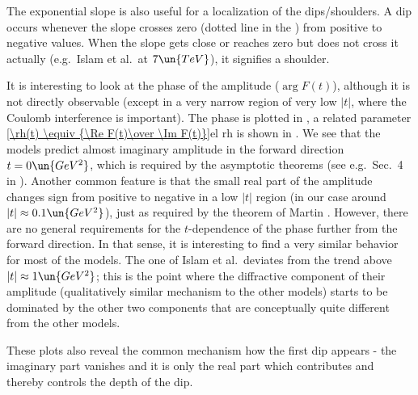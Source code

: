 The exponential slope is also useful for a localization of the dips/shoulders. A dip occurs whenever the slope crosses zero (dotted line in the ) from positive to negative values. When the slope gets close or reaches zero but does not cross it actually (e.g.~Islam et al.\ at $7\un{TeV}$), it signifies a shoulder.


It is interesting to look at the phase of the amplitude ($\arg F(t)$), although it is not directly observable (except in a very narrow region of very low $|t|$, where the Coulomb interference is important). The phase is plotted in , a related parameter 
\eqref{\rh(t) \equiv {\Re F(t)\over \Im F(t)}}{el rh}
is shown in . We see that the models predict almost imaginary amplitude in the forward direction $t=0\un{GeV^2}$, which is required by the asymptotic theorems (see e.g.~Sec.~4 in ). Another common feature is that the small real part of the amplitude changes sign from positive to negative in a low $|t|$ region (in our case around $|t| \approx 0.1\un{GeV^2}$), just as required by the theorem of Martin . However, there are no general requirements for the $t$-dependence of the phase further from the forward direction. In that sense, it is interesting to find a very similar behavior for most of the models. The one of Islam et al.\ deviates from the trend above $|t|\approx 1\un{GeV^2}$; this is the point where the diffractive component of their amplitude (qualitatively similar mechanism to the other models) starts to be dominated by the other two components that are conceptually quite different from the other models.


These plots also reveal the common mechanism how the first dip appears - the imaginary part vanishes and it is only the real part which contributes and thereby controls the depth of the dip.



